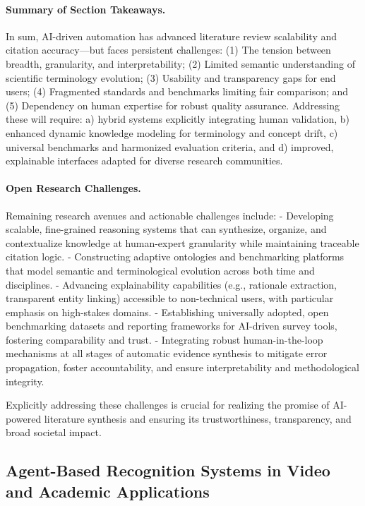 \documentclass[sigconf]{acmart}
\begin{document}
\paragraph{Summary of Section Takeaways.} In sum, AI-driven automation has advanced literature review scalability and citation accuracy—but faces persistent challenges: (1) The tension between breadth, granularity, and interpretability; (2) Limited semantic understanding of scientific terminology evolution; (3) Usability and transparency gaps for end users; (4) Fragmented standards and benchmarks limiting fair comparison; and (5) Dependency on human expertise for robust quality assurance. Addressing these will require: a) hybrid systems explicitly integrating human validation, b) enhanced dynamic knowledge modeling for terminology and concept drift, c) universal benchmarks and harmonized evaluation criteria, and d) improved, explainable interfaces adapted for diverse research communities.

\paragraph{Open Research Challenges.} Remaining research avenues and actionable challenges include:
- Developing scalable, fine-grained reasoning systems that can synthesize, organize, and contextualize knowledge at human-expert granularity while maintaining traceable citation logic.
- Constructing adaptive ontologies and benchmarking platforms that model semantic and terminological evolution across both time and disciplines.
- Advancing explainability capabilities (e.g., rationale extraction, transparent entity linking) accessible to non-technical users, with particular emphasis on high-stakes domains.
- Establishing universally adopted, open benchmarking datasets and reporting frameworks for AI-driven survey tools, fostering comparability and trust.
- Integrating robust human-in-the-loop mechanisms at all stages of automatic evidence synthesis to mitigate error propagation, foster accountability, and ensure interpretability and methodological integrity.

Explicitly addressing these challenges is crucial for realizing the promise of AI-powered literature synthesis and ensuring its trustworthiness, transparency, and broad societal impact.

\subsection{Agent-Based Recognition Systems in Video and Academic Applications}
\end{document}
